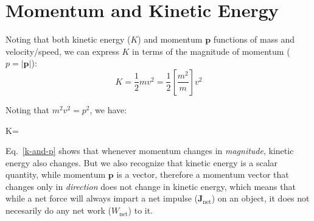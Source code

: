 



%






\section{Momentum and Kinetic Energy}
Noting that both kinetic energy ($K$) and momentum $\bm p$ functions of mass
and velocity/speed, we can express $K$ in terms of the magnitude of momentum
($p=|\bm p|$):
\begin{equation}
  K =\frac12mv^2 =\frac12\left[\frac{m^2}m\right]{v^2}
\end{equation}

Noting that $m^2v^2=p^2$, we have:
\begin{important-equation}
  K=
  \label{k-and-p}
\end{important-equation}

Eq.~\ref{k-and-p} shows that whenever momentum changes in \emph{magnitude},
kinetic energy also changes. But we also recognize that kinetic energy is a
scalar quantity, while momentum $\bm p$ is a vector, therefore a momentum
vector that changes only in \emph{direction} does not change in kinetic energy,
which means that while a net force will always impart a net impulse
($\bm J_\text{net}$) on an object, it does not necesarily do any net work
($W_\text{net}$) to it.



